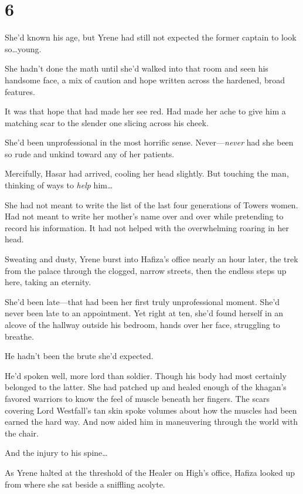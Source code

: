 
\chapter{6}

She'd known his age, but Yrene had still not expected the former captain to look so\ldots young.

She hadn't done the math until she'd walked into that room and seen his handsome face, a mix of caution and hope written across the hardened, broad features.

It was that hope that had made her see red. Had made her ache to give him a matching scar to the slender one slicing across his cheek.

She'd been unprofessional in the most horrific sense. Never---\emph{never} had she been so rude and unkind toward any of her patients.

Mercifully, Hasar had arrived, cooling her head slightly. But touching the man, thinking of ways to \emph{help} him\ldots

She had not meant to write the list of the last four generations of Towers women. Had not meant to write her mother's name over and over while pretending to record his information. It had not helped with the overwhelming roaring in her head.

Sweating and dusty, Yrene burst into Hafiza's office nearly an hour later, the trek from the palace through the clogged, narrow streets, then the endless steps up here, taking an eternity.

She'd been late---that had been her first truly unprofessional moment. She'd never been late to an appointment. Yet right at ten, she'd found herself in an alcove of the hallway outside his bedroom, hands over her face, struggling to breathe.

He hadn't been the brute she'd expected.

He'd spoken well, more lord than soldier. Though his body had most certainly belonged to the latter. She had patched up and healed enough of the khagan's favored warriors to know the feel of muscle beneath her fingers. The scars covering Lord Westfall's tan skin spoke volumes about how the muscles had been earned the hard way. And now aided him in maneuvering through the world with the chair.

And the injury to his spine\ldots

As Yrene halted at the threshold of the Healer on High's office, Hafiza looked up from where she sat beside a sniffling acolyte.


